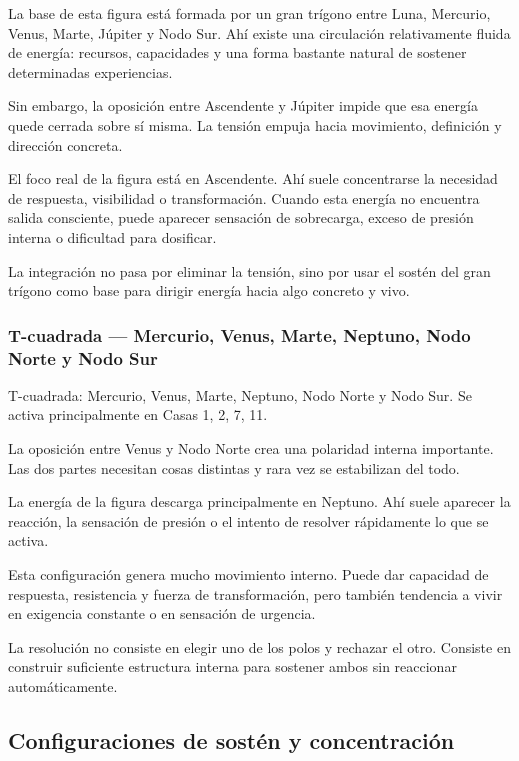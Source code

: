 \documentclass[11pt,a4paper]{article}
\begin{document}
La base de esta figura está formada por un gran trígono entre Luna, Mercurio, Venus, Marte, Júpiter y Nodo Sur. Ahí existe una circulación relativamente fluida de energía: recursos, capacidades y una forma bastante natural de sostener determinadas experiencias.

Sin embargo, la oposición entre Ascendente y Júpiter impide que esa energía quede cerrada sobre sí misma. La tensión empuja hacia movimiento, definición y dirección concreta.

El foco real de la figura está en Ascendente. Ahí suele concentrarse la necesidad de respuesta, visibilidad o transformación. Cuando esta energía no encuentra salida consciente, puede aparecer sensación de sobrecarga, exceso de presión interna o dificultad para dosificar.

La integración no pasa por eliminar la tensión, sino por usar el sostén del gran trígono como base para dirigir energía hacia algo concreto y vivo.

\subsubsection*{T-cuadrada — Mercurio, Venus, Marte, Neptuno, Nodo Norte y Nodo Sur}
T-cuadrada: Mercurio, Venus, Marte, Neptuno, Nodo Norte y Nodo Sur. Se activa principalmente en Casas 1, 2, 7, 11.

La oposición entre Venus y Nodo Norte crea una polaridad interna importante. Las dos partes necesitan cosas distintas y rara vez se estabilizan del todo.

La energía de la figura descarga principalmente en Neptuno. Ahí suele aparecer la reacción, la sensación de presión o el intento de resolver rápidamente lo que se activa.

Esta configuración genera mucho movimiento interno. Puede dar capacidad de respuesta, resistencia y fuerza de transformación, pero también tendencia a vivir en exigencia constante o en sensación de urgencia.

La resolución no consiste en elegir uno de los polos y rechazar el otro. Consiste en construir suficiente estructura interna para sostener ambos sin reaccionar automáticamente.

\subsection*{Configuraciones de sostén y concentración}

\end{document}
